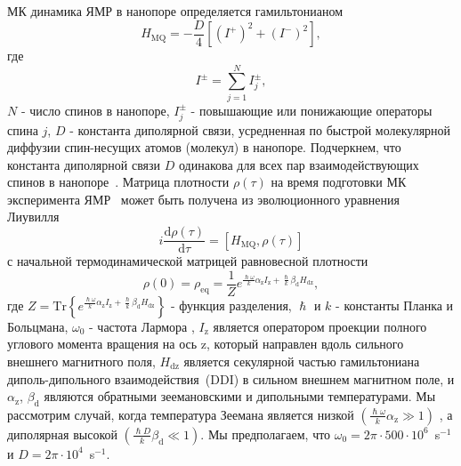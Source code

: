 \documentclass[utf8]{jetp}
\begin{document}
МК динамика ЯМР в нанопоре определяется гамильтонианом~\cite{Doronin_2019,Doronin_2009} 
%
\begin{equation}
    \label{eq:1}
    H_{\mathrm{MQ}} = - \dfrac{D}{4} \left[
        \left(I^{+}\right)^{2} 
        + \left(I^{-}\right)^{2} 
    \right] ,
\end{equation}
%
где 
%
\begin{equation}
    \label{eq:2}
    I^{\pm} = \sum\limits_{j=1}^{N} I_{j}^{\pm},
\end{equation}
%
$N$ - число спинов в нанопоре, $I^{\pm}_{j}$ - повышающие или понижающие операторы спина $j$, $D$ - константа диполярной связи, усредненная по быстрой молекулярной диффузии спин-несущих атомов (молекул) в нанопоре.
Подчеркнем, что константа диполярной связи $D$ одинакова для всех пар взаимодействующих спинов в нанопоре~\cite{Doronin_2019,Doronin_2009}.
Матрица плотности $\rho(\tau)$ на время подготовки МК эксперимента ЯМР~\cite{Baum_1985} может быть получена из эволюционного уравнения Лиувилля~\cite{Goldman_1970,Abragam_1982} 
%
\begin{equation}
    \label{eq:3}
    i\dfrac{\mathrm{d}\rho(\tau)}{\mathrm{d}\tau} = \left[
    H_\mathrm{MQ},\rho(\tau)
    \right]
\end{equation}
%
с начальной термодинамической матрицей равновесной плотности
%
\begin{equation}
    \label{eq:4}
       \rho(0) = \rho_\mathrm{eq} = \dfrac{1}{Z}
       e^{
            \frac{\hslash \omega}{k} \alpha_\mathrm{z} I_\mathrm{z} 
            + \frac{\hslash }{k} \beta_\mathrm{d} H_\mathrm{dz}
        },
\end{equation}
%
где 
$Z = \mathrm{Tr} \left\{ e^{\frac{\hslash \omega}{k} \alpha_\mathrm{z} I_\mathrm{z} + \frac{\hslash  }{k} \beta_\mathrm{d} H_\mathrm{dz}} \right\}$ - функция разделения, 
$\hslash$ и $k$ - константы Планка и Больцмана, 
$\omega_{0}$ - частота Лармора , $I_\mathrm{z}$ является оператором проекции полного углового момента вращения на ось z, 
который направлен вдоль сильного внешнего магнитного поля,  
$H_\mathrm{dz}$ является секулярной частью гамильтониана диполь-дипольного взаимодействия~(DDI) в сильном внешнем магнитном поле, и $\alpha_\mathrm{z}$, $\beta_\mathrm{d}$ являются обратными зеемановскими и дипольными температурами.
Мы рассмотрим случай, когда температура Зеемана является низкой $({\frac{\hslash \omega}{k} \alpha_\mathrm{z}}\gg 1)$ 
, а диполярная высокой $\left( \frac{\hslash{D}}{k}\beta_\mathrm{d} \ll 1\right)$.
Мы предполагаем, что $\omega_{0} = 2\pi \cdot 500 \cdot 10^{6}$~s$^{-1}$ и $D = 2\pi \cdot 10^{4}$~s$^{-1}$.
\end{document}
